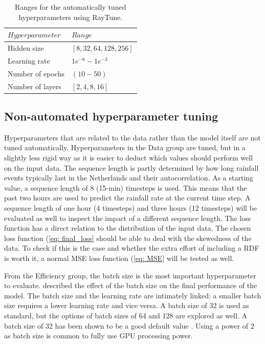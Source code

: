 \documentclass[twocolumn, 10pt, a4paper]{memoir}
\begin{document}
	\begin{table}
		\caption{Ranges for the automatically tuned hyperparameters using RayTune.}
		\label{tab: raytunetable}
		\centering
		\renewcommand{\arraystretch}{1.5}
		\begin{tabular}{p{2.5cm}p{4.2cm}}
			\hline
			$Hyperparameter$&$Range$\\
			\hline
			Hidden size&$[8,32,64,128,256]$\\
			Learning rate&$1e^{-6} - 1e^{-3}$\\
			Number of epochs&$(10 - 50)$\\
			Number of layers&$[2,4,8,16]$\\
			\hline
		\end{tabular}
	\end{table}
	
	\subsection{Non-automated hyperparameter tuning} \label{sec: Nonauto tuning}
	Hyperparameters that are related to the data rather than the model itself are not tuned automatically. Hyperparameters in the Data group are tuned, but in a slightly less rigid way as it is easier to deduct which values should perform well on the input data.
	The sequence length is partly determined by how long rainfall events typically last in the Netherlands and their autocorrelation. As a starting value, a sequence length of 8 (15-min) timesteps is used. This means that the past two hours are used to predict the rainfall rate at the current time step. A sequence length of one hour (4 timesteps) and three hours (12 timesteps) will be evaluated as well to inspect the impact of a different sequence length.
	The loss function has a direct relation to the distribution of the input data. The chosen loss function (\ref{eq: final_loss} should be able to deal with the skewedness of the data. To check if this is the case and whether the extra effort of including a RDF is worth it, a normal MSE loss function (\ref{eq: MSE} will be tested as well.
	
	From the Efficiency group, the batch size is the most important hyperparameter to evaluate. described the effect of the batch size on the final performance of the model. The batch size and the learning rate are intimately linked: a smaller batch size requires a lower learning rate and vice versa. A batch size of 32 is used as standard, but the options of batch sizes of 64 and 128 are explored as well. A batch size of 32 has been shown to be a good default value \cite{Bengio2012}. Using a power of 2 as batch size is common to fully use GPU processing power.
	
\end{document}
